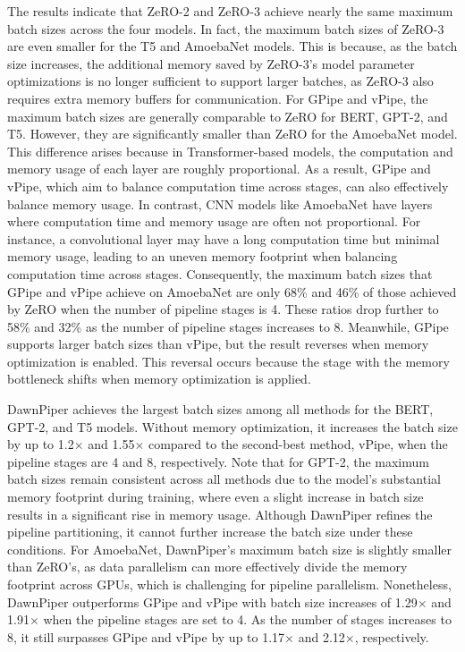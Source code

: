 The results indicate that ZeRO-2 and ZeRO-3 achieve nearly the same maximum batch sizes across the four models.
In fact, the maximum batch sizes of ZeRO-3 are even smaller for the T5 and AmoebaNet models.
This is because, as the batch size increases, the additional memory saved
by ZeRO-3's model parameter optimizations is no longer sufficient to support larger batches,
as ZeRO-3 also requires extra memory buffers for communication.
For GPipe and vPipe, the maximum batch sizes are generally comparable to ZeRO for BERT, GPT-2, and T5.
However, they are significantly smaller than ZeRO for the AmoebaNet model.
This difference arises because in Transformer-based models,
the computation and memory usage of each layer are roughly proportional.
As a result, GPipe and vPipe, which aim to balance computation time across stages,
can also effectively balance memory usage.
In contrast, CNN models like AmoebaNet have layers where computation time and memory usage are often not proportional.
For instance, a convolutional layer may have a long computation time but minimal memory usage,
leading to an uneven memory footprint when balancing computation time across stages.
Consequently, the maximum batch sizes that GPipe and vPipe achieve on AmoebaNet
are only 68\% and 46\% of those achieved by ZeRO when the number of pipeline stages is 4.
These ratios drop further to 58\% and 32\% as the number of pipeline stages increases to 8.
Meanwhile, GPipe supports larger batch sizes than vPipe,
but the result reverses when memory optimization is enabled.
This reversal occurs because the stage with the memory bottleneck shifts when memory optimization is applied.

DawnPiper achieves the largest batch sizes among all methods for the BERT, GPT-2, and T5 models.
Without memory optimization, it increases the batch size by up to 1.2$\times$ and 1.55$\times$
compared to the second-best method, vPipe, when the pipeline stages are 4 and 8, respectively.
Note that for GPT-2,
the maximum batch sizes remain consistent across all methods
due to the model's substantial memory footprint during training,
where even a slight increase in batch size results in a significant rise in memory usage.
Although DawnPiper refines the pipeline partitioning,
it cannot further increase the batch size under these conditions.
For AmoebaNet, DawnPiper's maximum batch size is slightly smaller than ZeRO’s,
as data parallelism can more effectively divide the memory footprint across GPUs,
which is challenging for pipeline parallelism.
Nonetheless, DawnPiper outperforms GPipe and vPipe with batch size increases of 1.29$\times$ and 1.91$\times$
when the pipeline stages are set to 4.
As the number of stages increases to 8, it still surpasses GPipe and vPipe by up to 1.17$\times$ and 2.12$\times$, respectively.

